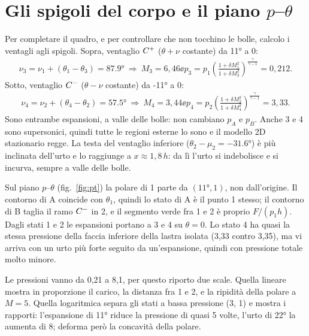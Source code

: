 \section*{Gli spigoli del corpo e il piano $p$--$\theta$}
Per completare il quadro, e per controllare che non tocchino le bolle, calcolo i ventagli agli spigoli. Sopra,
ventaglio $C^{+}$ ($\theta+\nu$ costante) da \ang{11} a 0:
\begin{gather*}
\nu_3=\nu_1+(\theta_1-\theta_3)=\ang{87.9}\ \Rightarrow\ M_3=6{,}46 \ee
p_3=p_1\left(\frac{1+\delta M_1^2}{1+\delta M_3^2}\right)^{\frac{\gamma}{\gamma-1}}=0{,}212 .
\end{gather*}
Sotto, ventaglio $C^{-}$ ($\theta-\nu$ costante) da \ang{-11} a 0:
\begin{gather*}
\nu_4=\nu_2+(\theta_4-\theta_2)=\ang{57.5}\ \Rightarrow\ M_4=3{,}44 \ee
p_4=p_2\left(\frac{1+\delta M_2^2}{1+\delta M_4^2}\right)^{\frac{\gamma}{\gamma-1}}=3{,}33 .
\end{gather*}
Sono entrambe espansioni, a valle delle bolle: non cambiano $p_A$ e $p_B$. Anche 3 e 4 sono supersonici, quindi tutte
le regioni esterne lo sono e il modello 2D stazionario regge. La testa del ventaglio inferiore
($\theta_2-\mu_2=\ang{-31.6}$) è più inclinata dell'urto e lo raggiunge a $x\approx1{,}8\,h$: da lì l'urto si
indebolisce e si incurva, sempre a valle delle bolle.


Sul piano $p$--$\theta$ (fig.~\ref{fig:pt}) la polare di 1 parte da $(\ang{11},1)$, non dall'origine. Il contorno di
A coincide con $\theta_1$, quindi lo stato di A è il punto 1 stesso; il contorno di B taglia il ramo $C^{-}$ in 2, e il
segmento verde fra 1 e 2 è proprio $F/(p_1h)$. Dagli stati 1 e 2 le espansioni portano a 3 e 4 su $\theta=0$. Lo
stato 4 ha quasi la stessa pressione della faccia inferiore della lastra isolata (3,33 contro 3,35), ma vi arriva con
un urto più forte seguito da un'espansione, quindi con pressione totale molto minore.

Le pressioni vanno da 0,21 a 8,1, per questo riporto due scale. Quella lineare mostra in proporzione il carico, la
distanza fra 1 e 2, e la ripidità della polare a $M=5$. Quella logaritmica separa gli stati a bassa pressione (3, 1)
e mostra i rapporti: l'espansione di \ang{11} riduce la pressione di quasi 5 volte, l'urto di \ang{22} la aumenta di 8;
deforma però la concavità della polare.

